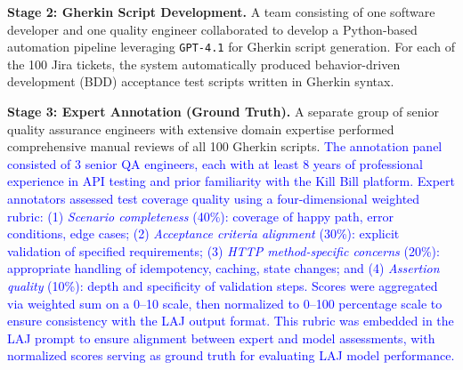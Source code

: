 \documentclass[letterpaper]{article} %
\newcommand{\add}[1]{\textcolor{blue}{#1}}
\newcommand{\add}[1]{#1}
\begin{document}
\textbf{Stage 2: Gherkin Script Development.} A team consisting of one software developer and one quality engineer collaborated to develop a Python-based automation pipeline leveraging \texttt{GPT-4.1} for Gherkin script generation. For each of the 100 Jira tickets, the system automatically produced behavior-driven development (BDD) acceptance test scripts written in Gherkin syntax. %



\textbf{Stage 3: Expert Annotation (Ground Truth).} A separate group of senior quality assurance engineers with extensive domain expertise performed comprehensive manual reviews of all 100 Gherkin scripts.\add{ The annotation panel consisted of 3 senior QA engineers, each with at least 8 years of professional experience in API testing and prior familiarity with the Kill Bill platform. Expert annotators assessed test coverage quality using a four-dimensional weighted rubric: (1) \textit{Scenario completeness} (40\%): coverage of happy path, error conditions, edge cases; (2) \textit{Acceptance criteria alignment} (30\%): explicit validation of specified requirements; (3) \textit{HTTP method-specific concerns} (20\%): appropriate handling of idempotency, caching, state changes; and (4) \textit{Assertion quality} (10\%): depth and specificity of validation steps. Scores were aggregated via weighted sum on a 0--10 scale, then normalized to 0--100 percentage scale to ensure consistency with the LAJ output format. This rubric was embedded in the LAJ prompt to ensure alignment between expert and model assessments, with normalized scores serving as ground truth for evaluating LAJ model performance.}
\end{document}
